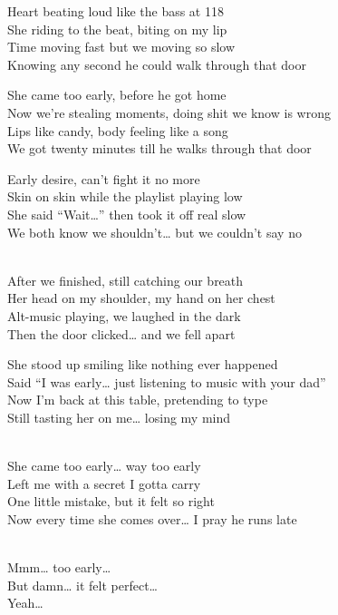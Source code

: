 \begin{lyrics}
Heart beating loud like the bass at 118\\
She riding to the beat, biting on my lip\\
Time moving fast but we moving so slow\\
Knowing any second he could walk through that door

She came too early, before he got home\\
Now we’re stealing moments, doing shit we know is wrong\\
Lips like candy, body feeling like a song\\
We got twenty minutes till he walks through that door

Early desire, can’t fight it no more\\
Skin on skin while the playlist playing low\\
She said “Wait…” then took it off real slow\\
We both know we shouldn’t… but we couldn’t say no

\\
After we finished, still catching our breath\\
Her head on my shoulder, my hand on her chest\\
Alt-music playing, we laughed in the dark\\
Then the door clicked… and we fell apart

She stood up smiling like nothing ever happened\\
Said “I was early… just listening to music with your dad”\\
Now I’m back at this table, pretending to type\\
Still tasting her on me… losing my mind

\\
She came too early… way too early\\
Left me with a secret I gotta carry\\
One little mistake, but it felt so right\\
Now every time she comes over… I pray he runs late

\\
Mmm… too early…\\
But damn… it felt perfect…\\
Yeah…

\end{lyrics}

